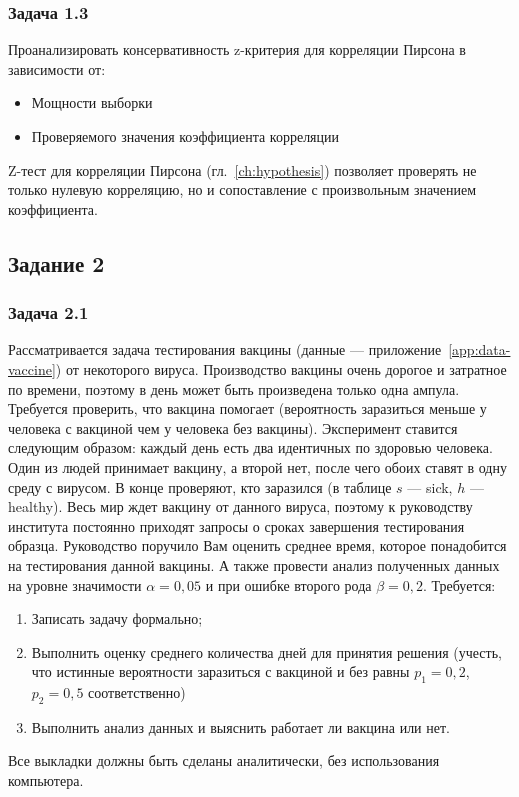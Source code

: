 \subsubsection{Задача 1.3}

Проанализировать консервативность z-критерия для корреляции Пирсона в зависимости от:
\begin{itemize}
    \item Мощности выборки
    \item Проверяемого значения коэффициента корреляции
\end{itemize}
Z-тест для корреляции Пирсона (гл.~\ref{ch:hypothesis}) позволяет проверять не только нулевую корреляцию, но и сопоставление с произвольным значением коэффициента.

\subsection{Задание 2}


\subsubsection{Задача 2.1}

Рассматривается задача тестирования вакцины (данные --- приложение~\ref{app:data-vaccine}) от некоторого вируса. Производство вакцины очень дорогое и затратное по времени, поэтому в день может быть произведена только одна ампула.
Требуется проверить, что вакцина помогает (вероятность заразиться меньше у человека с вакциной чем у человека без вакцины).
Эксперимент ставится следующим образом: каждый день есть два идентичных по здоровью человека. Один из людей принимает вакцину, а второй нет, после чего обоих ставят в одну среду с вирусом. В конце проверяют, кто заразился (в таблице $s$ --- sick, $h$ --- healthy).
Весь мир ждет вакцину от данного вируса, поэтому к руководству института постоянно приходят запросы о сроках завершения тестирования образца. Руководство поручило Вам оценить среднее время, которое понадобится на тестирования данной вакцины. А также провести анализ полученных данных на уровне значимости $\alpha=0{,}05$ и при ошибке второго рода $\beta=0{,}2$.
Требуется:
\begin{enumerate}
    \item Записать задачу формально;
    \item Выполнить оценку среднего количества дней для принятия решения (учесть, что истинные вероятности заразиться с вакциной и без равны $p_1=0{,}2$, $p_2=0{,}5$ соответственно)
    \item Выполнить анализ данных и выяснить работает ли вакцина или нет.
\end{enumerate}
Все выкладки должны быть сделаны аналитически, без использования компьютера.

